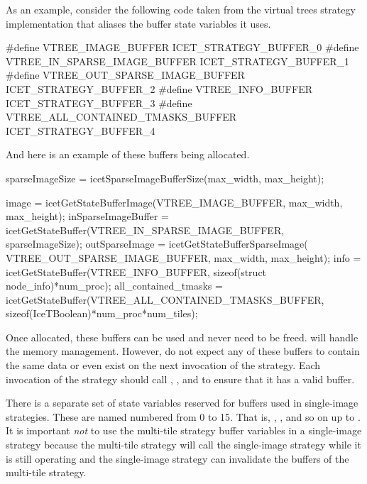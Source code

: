 As an example, consider the following code taken from the virtual trees
strategy implementation that aliases the buffer state variables it uses.

\begin{code}
#define VTREE_IMAGE_BUFFER              ICET_STRATEGY_BUFFER_0
#define VTREE_IN_SPARSE_IMAGE_BUFFER    ICET_STRATEGY_BUFFER_1
#define VTREE_OUT_SPARSE_IMAGE_BUFFER   ICET_STRATEGY_BUFFER_2
#define VTREE_INFO_BUFFER               ICET_STRATEGY_BUFFER_3
#define VTREE_ALL_CONTAINED_TMASKS_BUFFER ICET_STRATEGY_BUFFER_4
\end{code}

And here is an example of these buffers being allocated.

\begin{code}
sparseImageSize = icetSparseImageBufferSize(max_width, max_height);

image                = icetGetStateBufferImage(VTREE_IMAGE_BUFFER,
                                               max_width, max_height);
inSparseImageBuffer  = icetGetStateBuffer(VTREE_IN_SPARSE_IMAGE_BUFFER,
                                          sparseImageSize);
outSparseImage       = icetGetStateBufferSparseImage(
                                              VTREE_OUT_SPARSE_IMAGE_BUFFER,
                                              max_width, max_height);
info                 = icetGetStateBuffer(VTREE_INFO_BUFFER,
                                         sizeof(struct node_info)*num_proc);
all_contained_tmasks = icetGetStateBuffer(VTREE_ALL_CONTAINED_TMASKS_BUFFER,
                                    sizeof(IceTBoolean)*num_proc*num_tiles);
\end{code}

Once allocated, these buffers can be used and never need to be freed.
\IceT will handle the memory management.  However, do not expect any of
these buffers to contain the same data or even exist on the next invocation
of the strategy.  Each invocation of the strategy should call
, , and
 to ensure that it has a valid buffer.

There is a separate set of state variables reserved for buffers used in
single-image strategies.  These are named
 numbered from 0 to 15.
That is, ,
, and so on up to
.  It is important \emph{not} to use
the multi-tile strategy buffer variables in a single-image strategy because
the multi-tile strategy will call the single-image strategy while it is
still operating and the single-image strategy can invalidate the buffers of
the multi-tile strategy.

